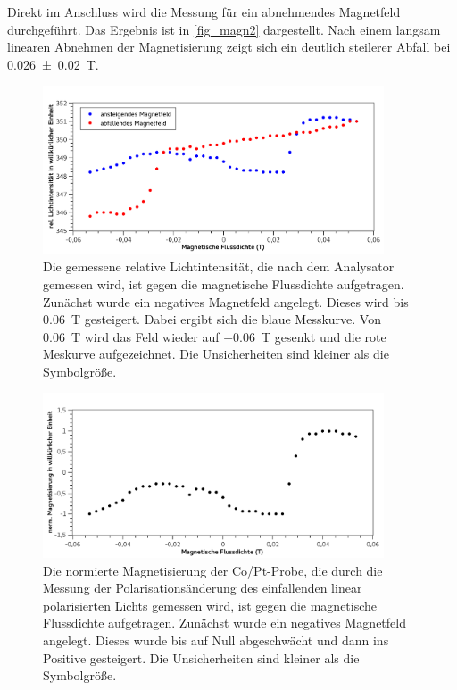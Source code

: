\documentclass[
	a4paper,
	12pt,
	pagesize,
	ngerman
]{scrartcl}
\begin{document}
	Direkt im Anschluss wird die Messung für ein abnehmendes Magnetfeld durchgeführt.
	Das Ergebnis ist in \cref{fig_magn2} dargestellt.
	Nach einem langsam linearen Abnehmen der Magnetisierung zeigt sich ein deutlich steilerer Abfall bei \SI{0,026+-0,02}{T}.
	
	
	\begin{figure}[H] 
		\includegraphics[width=0.90\textwidth]{fig_magn_licht} %
		\centering
		\caption{Die gemessene relative Lichtintensität, die nach dem Analysator gemessen wird, ist gegen die magnetische Flussdichte aufgetragen. 
		Zunächst wurde ein negatives Magnetfeld angelegt. 
		Dieses wird bis \SI{0,06}{T} gesteigert.
		Dabei ergibt sich die blaue Messkurve.
		Von \SI{0,06}{T} wird das Feld wieder auf \SI{-0,06}{T} gesenkt und die rote Meskurve aufgezeichnet.
		Die Unsicherheiten sind kleiner als die Symbolgröße.} %
		\label{fig_magn_licht}
		\centering
	\end{figure}

	\begin{figure}[H]  
		\includegraphics[width=0.90\textwidth]{fig_magn1} %
		\centering
		\caption{Die normierte Magnetisierung der Co/Pt-Probe, die durch die Messung der Polarisationsänderung des einfallenden linear polarisierten Lichts gemessen wird, ist gegen die magnetische Flussdichte aufgetragen. 
		Zunächst wurde ein negatives Magnetfeld angelegt. 
		Dieses wurde bis auf Null abgeschwächt und dann ins Positive gesteigert. 
		Die Unsicherheiten sind kleiner als die Symbolgröße.} %
		\label{fig_magn1}
		\centering
	\end{figure}
	
\end{document}

